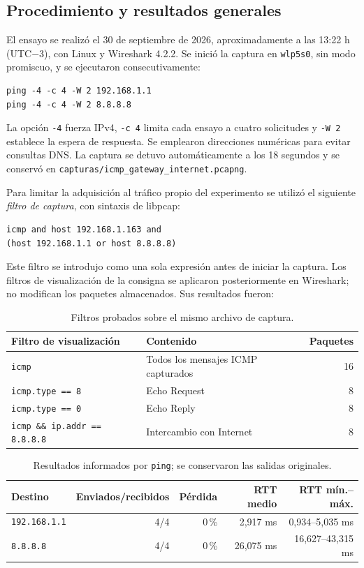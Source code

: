 \documentclass[12pt,a4paper]{article}
\begin{document}
\subsection{Procedimiento y resultados generales}

El ensayo se realizó el 30 de septiembre de 2026, aproximadamente a las
13:22 h (UTC$-3$), con Linux y Wireshark 4.2.2. Se inició la captura en
\texttt{wlp5s0}, sin modo promiscuo, y se ejecutaron consecutivamente:
\begin{verbatim}
ping -4 -c 4 -W 2 192.168.1.1
ping -4 -c 4 -W 2 8.8.8.8
\end{verbatim}
La opción \texttt{-4} fuerza IPv4, \texttt{-c 4} limita cada ensayo a cuatro
solicitudes y \texttt{-W 2} establece la espera de respuesta. Se emplearon
direcciones numéricas para evitar consultas DNS. La captura se detuvo
automáticamente a los 18 segundos y se conservó en
\texttt{capturas/icmp\_gateway\_internet.pcapng}.

Para limitar la adquisición al tráfico propio del experimento se utilizó
el siguiente \emph{filtro de captura}, con sintaxis de libpcap:
\begin{verbatim}
icmp and host 192.168.1.163 and
(host 192.168.1.1 or host 8.8.8.8)
\end{verbatim}
Este filtro se introdujo como una sola expresión antes de iniciar la captura.
Los filtros de visualización de la consigna se aplicaron posteriormente en
Wireshark; no modifican los paquetes almacenados. Sus resultados fueron:

\begin{table}[H]
\centering\small
\begin{tabular}{@{}llr@{}}
\toprule
\textbf{Filtro de visualización} & \textbf{Contenido} & \textbf{Paquetes} \\
\midrule
\texttt{icmp} & Todos los mensajes ICMP capturados & 16 \\
\texttt{icmp.type == 8} & Echo Request & 8 \\
\texttt{icmp.type == 0} & Echo Reply & 8 \\
\texttt{icmp \&\& ip.addr == 8.8.8.8} & Intercambio con Internet & 8 \\
\bottomrule
\end{tabular}
\caption{Filtros probados sobre el mismo archivo de captura.}
\label{tab:icmp-filtros}
\end{table}

\begin{table}[H]
\centering\small
\begin{tabular}{@{}lrrrr@{}}
\toprule
\textbf{Destino} & \textbf{Enviados/recibidos} & \textbf{Pérdida} &
\textbf{RTT medio} & \textbf{RTT mín.--máx.} \\
\midrule
\texttt{192.168.1.1} & 4/4 & 0\,\% & 2,917 ms & 0,934--5,035 ms \\
\texttt{8.8.8.8} & 4/4 & 0\,\% & 26,075 ms & 16,627--43,315 ms \\
\bottomrule
\end{tabular}
\caption{Resultados informados por \texttt{ping}; se conservaron las salidas originales.}
\label{tab:icmp-rtt}
\end{table}
\end{document}

